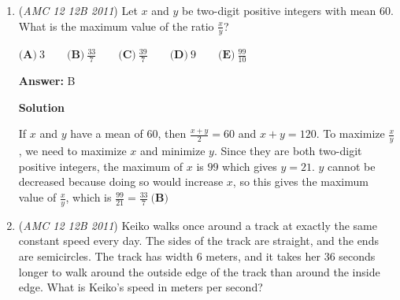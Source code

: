 \begin{enumerate}
 1/2 (216°-144°) = 1/2 (72°) $=\boxed{36 \textbf{(C)}}.$




\textbf{Solution 2}

Let arc A be 3x and arc B be 2x. Then the angle formed by the tangents is $\frac{3x-2x}2 = \frac {x} 2$ by the arc length formula. Also note that $3x + 2x = 360$, which simplifies to $x= 72.$ Hence the angle formed by the tangents is equal to $\boxed{36 \textbf{(C)}}$.

 



\textbf{Solution 3}

Let the center of the circle be $O$. The radii extending from $O$ to the points of tangency $B$ and $C$ are both perpendicular to lines $AB$ and $AC$. Thus $\angle ABO = \angle ACO = 90^{\circ}$, and quadrilateral $ABOC$ is cyclic, since the opposite angles add to $180^{\circ}$. 

 Since the ratio of the arc lengths is $2 : 3$, the shorter arc (the arc cut off by $\angle BOC$) is $144^{\circ}$. 

 $\angle BOC$ and $\angle BAC$ must add up to $180^{\circ}$ since quadrilateral $ABOC$ is cyclic, so $\angle BAC = 180 - 144 = \boxed{\textbf{(C) } 36}$.

 -Solution by Joeya

 


	\item (\textit{AMC 12 12B 2011}) Let $x$ and $y$ be two-digit positive integers with mean $60$.  What is the maximum value of the ratio $\frac{x}{y}$?


 $\textbf{(A)}\ 3 \qquad \textbf{(B)}\ \frac{33}{7} \qquad \textbf{(C)}\ \frac{39}{7} \qquad \textbf{(D)}\ 9 \qquad \textbf{(E)}\ \frac{99}{10}$

 \textbf{Answer: }B



\textbf{Solution}

If $x$ and $y$ have a mean of $60$, then $\frac{x+y}{2}=60$ and $x+y=120$. To maximize $\frac{x}{y}$, we need to maximize $x$ and minimize $y$. Since they are both two-digit positive integers, the maximum of $x$ is $99$ which gives $y=21$. $y$ cannot be decreased because doing so would increase $x$, so this gives the maximum value of $\frac{x}{y}$, which is $\frac{99}{21}=\boxed{\frac{33}{7}\ \textbf{(B)}}$



	\item (\textit{AMC 12 12B 2011}) Keiko walks once around a track at exactly the same constant speed every day. The sides of the track are straight, and the ends are semicircles. The track has width $6$ meters, and it takes her $36$ seconds longer to walk around the outside edge of the track than around the inside edge. What is Keiko's speed in meters per second?



\end{enumerate}
